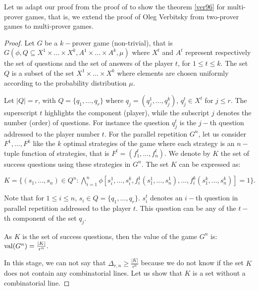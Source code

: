 Let us adapt our proof from the proof of  \cite{verbitsky1996towards} to show the theorem \eqref{ver96} for multi-prover games, that is, we extend the proof of Oleg Verbitsky from two-prover games to multi-prover games.

\begin{proof}
  Let $G$ be a $k-$prover game (non-trivial), that is $G(\phi, Q\subseteq X^1 \times \ldots \times X^k, A^1 \times \ldots \times A^k, \mu)$ where $X^t$ and $A^t$ represent respectively the set of questions and the set of answers of the player $t$, for $1\leq t \leq k.$ The set $Q$ is a subset of the set $X^1 \times \ldots \times X^k$ where elements are chosen uniformly  according to the probability distribution $\mu$.

 Let $|Q|=r$, with $Q=\{q_1, \ldots, q_r\}$ where $q_j=(q_j^1,\ldots, q_j^k)$, $q_j^t \in X^t$ for $j\leq r.$ The superscript  $t$ highlights the component (player), while the subscript $j$ denotes the number (order) of questions. For instance the question $q_j^t$ is the $j-$th question addressed to the player number $t.$  For the parallel repetition $G^n$, let us consider $F^1, \ldots, F^k$ like the $k$ optimal strategies of the game where each strategy is an $n-$tuple function of strategies, that is $F^t=(f_1^t,\ldots, f_n^t)$. We denote by $K$ the set of success questions using these strategies in $G^n.$ The set $K$ can be expressed as: 
 
 $K=\{(s_1, \ldots, s_n) \in Q^n: \bigwedge\limits_{i=1}^n \phi \left[ s_i^1, \ldots, s_i^k, f_i^1(s_1^1, \ldots, s_n^1), \ldots, f_i^k(s_1^k, \ldots, s_n^k) \right]=1 \}.$

Note that for $1\leq i \leq n$,  $s_i \in Q=\{q_1, \ldots, q_r\}.$ $s_i^t$ denotes an $i-$th question in parallel repetition addressed to the player $t$. This question can be any of the $t-$th component of the set  $q_j.$
 
As $K$ is the set of success questions, then the value of the game $G^n$ is: $\mathrm{val} (G^n) = \frac{|K|}{r^n}.$
 
In this stage, we can not say that $\Delta_{r,n} \geq \frac{|K|}{r^n}$
because we do not know if the set  $K$ does not contain any combinatorial lines. Let us show that $K$ is a set without a combinatorial line.


\end{proof}
